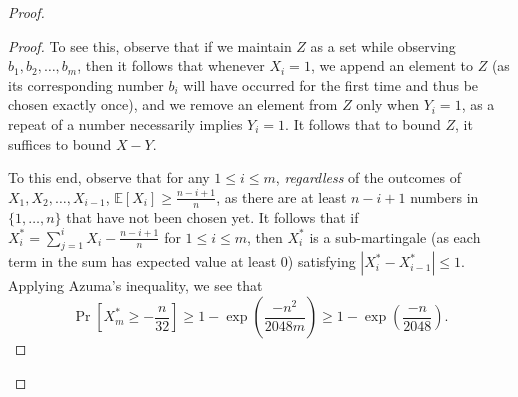 \begin{proof}
\begin{proof}
To see this, observe that if we maintain $Z$ as a set while observing $b_1, b_2, \dots, b_m$, then it follows that whenever $X_i = 1$, we append an element to $Z$ (as its corresponding number $b_i$ will have occurred for the first time and thus be chosen exactly once), and we remove an element from $Z$ only when $Y_i = 1$, as a repeat of a number necessarily implies $Y_i = 1$. It follows that to bound $Z$, it suffices to bound $X- Y$. 

To this end, observe that for any $1 \leq i \leq m$, \textit{regardless} of the outcomes of $X_1, X_2, \dots, X_{i-1}$, $\mathbb{E}[X_i] \geq \frac{n -i + 1}{n}$, as there are at least $n - i + 1$ numbers in $\{1, \dots, n\}$ that have not been chosen yet. It follows that if $X_i^* = \sum_{j = 1}^i X_i - \frac{n -i + 1}{n}$ for $1 \leq i \leq m$, then $X_i^*$ is a sub-martingale (as each term in the sum has expected value at least $0$) satisfying $|X_i^* - X_{i-1}^*| \leq 1$. Applying Azuma's inequality, we see that $$\Pr[X_m^* \geq -\frac{n}{32}] \geq 1 - \exp \left( \frac{-n^2}{2048m}\right) \geq 1 - \exp \left(\frac{-n}{2048}\right).$$


\end{proof}
\end{proof}
